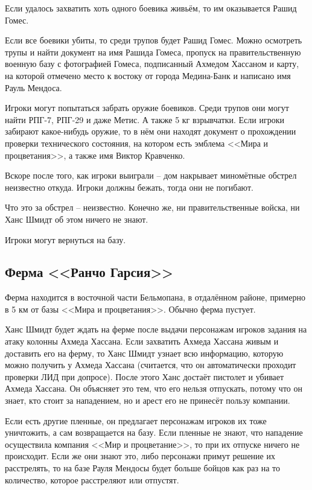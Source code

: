 \documentclass{article}
\begin{document}
Если удалось захватить хоть одного боевика живьём, то им оказывается
Рашид Гомес.

Если все боевики убиты, то среди трупов будет Рашид Гомес. Можно
осмотреть трупы и найти документ на имя Рашида Гомеса, пропуск на
правительственную военную базу с фотографией Гомеса, подписанный Ахмедом
Хассаном и карту, на которой отмечено место к востоку от города
Медина-Банк и написано имя Рауль Мендоса.

Игроки могут попытаться забрать оружие боевиков. Среди трупов они могут
найти РПГ-7, РПГ-29 и даже Метис. А также 5 кг взрывчатки. Если игроки
забирают какое-нибудь оружие, то в нём они находят документ о
прохождении проверки технического состояния, на котором есть эмблема
<<Мира и процветания>>, а также имя Виктор Кравченко.

Вскоре после того, как игроки выиграли -- дом накрывает миномётные
обстрел неизвестно откуда. Игроки должны бежать, тогда они не погибают.

Что это за обстрел -- неизвестно. Конечно же, ни правительственные
войска, ни Ханс Шмидт об этом ничего не знают.

Игроки могут вернуться на базу.

\subsection{Ферма <<Ранчо
Гарсия>>}\label{ranch-garcia}

Ферма находится в восточной части Бельмопана, в отдалённом районе,
примерно в 5 км от базы <<Мира и процветания>>. Обычно ферма пустует.

Ханс Шмидт будет ждать на ферме после выдачи персонажам игроков задания
на атаку колонны Ахмеда Хассана. Если захватить Ахмеда Хассана живым и
доставить его на ферму, то Ханс Шмидт узнает всю информацию, которую
можно получить у Ахмеда Хассана (считается, что он автоматически
проходит проверки ЛИД при допросе). После этого Ханс достаёт пистолет и
убивает Ахмеда Хассана. Он объясняет это тем, что его нельзя отпускать,
потому что он знает, кто стоит за нападением, но и арест его не принесёт
пользу компании.

Если есть другие пленные, он предлагает персонажам игроков их тоже
уничтожить, а сам возвращается на базу. Если пленные не знают, что
нападение осуществила компания <<Мир и процветание>>, то при их отпуске
ничего не происходит. Если же они знают это, либо персонажи примут
решение их расстрелять, то на базе Рауля Мендосы будет больше бойцов как
раз на то количество, которое расстреляют или отпустят.
\end{document}
